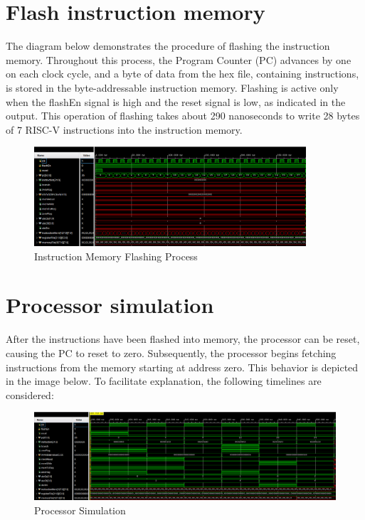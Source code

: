 
\newpage
{}
\section{Flash instruction memory}

The diagram below demonstrates the procedure of flashing the instruction memory. Throughout this process, the Program Counter (PC) advances by one on each clock cycle, and a byte of data from the hex file, containing instructions, is stored in the byte-addressable instruction memory. Flashing is active only when the flashEn signal is high and the reset signal is low, as indicated in the output. This operation of flashing takes about 290 nanoseconds to write 28 bytes of 7 RISC-V instructions into the instruction memory.

\begin{figure}[h!]
    \centering
    \includegraphics[width=0.9\textwidth, height=0.3\textheight]{Image/01_Sim.png}
    \caption{Instruction Memory Flashing Process}
    \label{fig:flash_memory}
\end{figure}

\section{Processor simulation}

After the instructions have been flashed into memory, the processor can be reset, causing the PC to reset to zero. Subsequently, the processor begins fetching instructions from the memory starting at address zero. This behavior is depicted in the image below. To facilitate explanation, the following timelines are considered:

\begin{figure}[h!]
    \centering
    \includegraphics[width=1.0\textwidth, height=0.23\textheight]{Image/02_sim.png}
    \caption{Processor Simulation}
    \label{fig:processor_simulation}
\end{figure}

